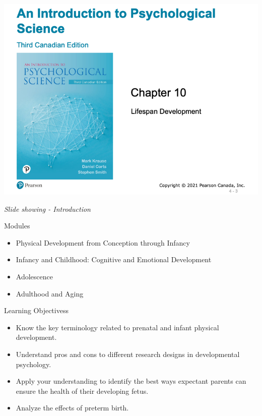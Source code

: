 \documentclass[
]{book}
\providecommand{\tightlist}{%
  \setlength{\itemsep}{0pt}\setlength{\parskip}{0pt}}
\begin{document}
\begin{reflect}
\includegraphics{assets/unit_3/slide_3.png}

\emph{Slide showing - Introduction}

Modules

\begin{itemize}
\tightlist
\item
  Physical Development from Conception through Infancy\\
\item
  Infancy and Childhood: Cognitive and Emotional Development\\
\item
  Adolescence\\
\item
  Adulthood and Aging
\end{itemize}

Learning Objectivess

\begin{itemize}
\tightlist
\item
  Know the key terminology related to prenatal and infant physical development.\\
\item
  Understand pros and cons to different research designs in developmental psychology.\\
\item
  Apply your understanding to identify the best ways expectant parents can ensure the health of their developing fetus.\\
\item
  Analyze the effects of preterm birth.
\end{itemize}


\end{reflect}
\end{document}
